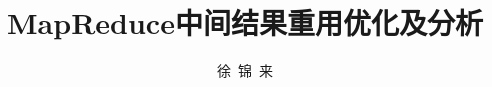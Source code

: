 \documentclass[master,oldfontcfg,euler,twoside,openany]{cugthesis}
\title{MapReduce中间结果重用优化及分析}%
\author{徐\ 锦\ 来}
\begin{document}
  \maketitle

\frontmatter
\makeatletter
\ifustc@bachelor
	
	
	\tableofcontents

	\ustclot
	\ustclof
	\ustcloa
	
\else
  
	\tableofcontents

	\ustclot
	\ustclof
	
\fi
\makeatother

\mainmatter

  
  
  
  
  
  

\backmatter
  \makeatletter
  \ifustc@bachelor\relax\else
  \fi
  \makeatother
  
  \nocite{*} %

  \begin{appendix}
    
  \end{appendix}

  

  
\end{document}
